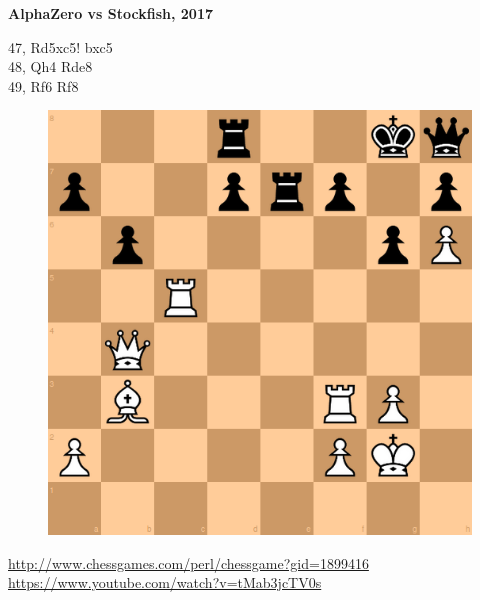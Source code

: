 \documentclass[xcolor=dvipsnames]{beamer}
\begin{document}
\begin{frame}{\bf AlphaZero vs Stockfish, 2017}

47, Rd5xc5! bxc5 \\
48, Qh4 Rde8 \\
49, Rf6 Rf8 \\
\begin{figure}[!htb]
  \centering
  \includegraphics[scale=0.25]{../../pictures/AlphaZero_Stockfish_2017_01.png}
\end{figure}

\url{http://www.chessgames.com/perl/chessgame?gid=1899416}
\url{https://www.youtube.com/watch?v=tMab3jcTV0s}

\end{frame}
\end{document}
